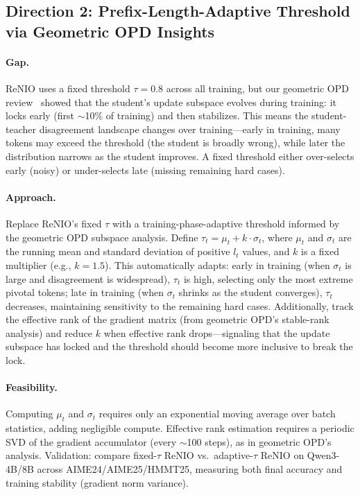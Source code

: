 \documentclass[11pt,a4paper]{article}
\begin{document}
\subsection{Direction 2: Prefix-Length-Adaptive Threshold via Geometric OPD Insights}

\paragraph{Gap.} ReNIO uses a fixed threshold $\tau = 0.8$ across all training, but our geometric OPD review~\cite{shen2026geometry} showed that the student's update subspace evolves during training: it locks early (first $\sim$10\% of training) and then stabilizes. This means the student-teacher disagreement landscape changes over training---early in training, many tokens may exceed the threshold (the student is broadly wrong), while later the distribution narrows as the student improves. A fixed threshold either over-selects early (noisy) or under-selects late (missing remaining hard cases).

\paragraph{Approach.} Replace ReNIO's fixed $\tau$ with a training-phase-adaptive threshold informed by the geometric OPD subspace analysis. Define $\tau_t = \mu_t + k \cdot \sigma_t$, where $\mu_t$ and $\sigma_t$ are the running mean and standard deviation of positive $l_t$ values, and $k$ is a fixed multiplier (e.g., $k=1.5$). This automatically adapts: early in training (when $\sigma_t$ is large and disagreement is widespread), $\tau_t$ is high, selecting only the most extreme pivotal tokens; late in training (when $\sigma_t$ shrinks as the student converges), $\tau_t$ decreases, maintaining sensitivity to the remaining hard cases. Additionally, track the effective rank of the gradient matrix (from geometric OPD's stable-rank analysis) and reduce $k$ when effective rank drops---signaling that the update subspace has locked and the threshold should become more inclusive to break the lock.

\paragraph{Feasibility.} Computing $\mu_t$ and $\sigma_t$ requires only an exponential moving average over batch statistics, adding negligible compute. Effective rank estimation requires a periodic SVD of the gradient accumulator (every $\sim$100 steps), as in geometric OPD's analysis. Validation: compare fixed-$\tau$ ReNIO vs.\ adaptive-$\tau$ ReNIO on Qwen3-4B/8B across AIME24/AIME25/HMMT25, measuring both final accuracy and training stability (gradient norm variance).
\end{document}
